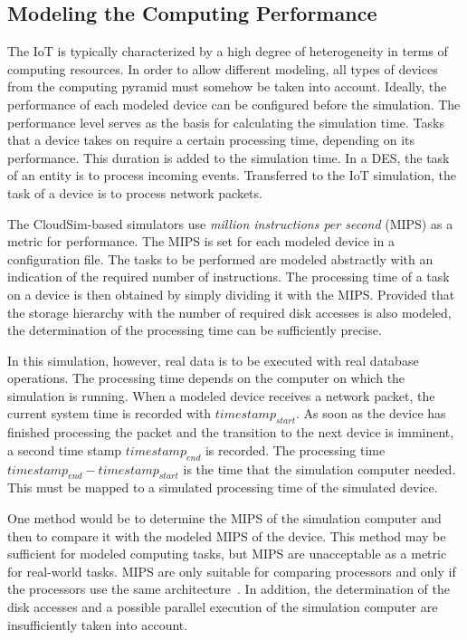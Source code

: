 \documentclass[english,version-2019-11]{uzl-thesis}
\begin{document}
\subsection{Modeling the Computing Performance}
The IoT is typically characterized by a high degree of heterogeneity in terms of computing resources. In order to allow different modeling, all types of devices from the computing pyramid must somehow be taken into account. Ideally, the performance of each modeled device can be configured before the simulation. The performance level serves as the basis for calculating the simulation time. Tasks that a device takes on require a certain processing time, depending on its performance. This duration is added to the simulation time. In a DES, the task of an entity is to process incoming events. Transferred to the IoT simulation, the task of a device is to process network packets.

The CloudSim-based simulators use \emph{million instructions per second} (MIPS) as a metric for performance. The MIPS is set for each modeled device in a configuration file. The tasks to be performed are modeled abstractly with an indication of the required number of instructions. The processing time of a task on a device is then obtained by simply dividing it with the MIPS. Provided that the storage hierarchy with the number of required disk accesses is also modeled, the determination of the processing time can be sufficiently precise.

In this simulation, however, real data is to be executed with real database operations. The processing time depends on the computer on which the simulation is running. When a modeled device receives a network packet, the current system time is recorded with $timestamp_{start}$.
As soon as the device has finished processing the packet and the transition to the next device is imminent, a second time stamp $timestamp_{end}$ is recorded. The processing time $timestamp_{end} - timestamp_{start}$ is the time that the simulation computer needed. This must be mapped to a simulated processing time of the simulated device.

One method would be to determine the MIPS of the simulation computer and then to compare it with the modeled MIPS of the device. This method may be sufficient for modeled computing tasks, but MIPS are unacceptable as a metric for real-world tasks. MIPS are only suitable for comparing processors and only if the processors use the same architecture~\cite{MIPS}. In addition, the determination of the disk accesses and a possible parallel execution of the simulation computer are insufficiently taken into account.
\end{document}

